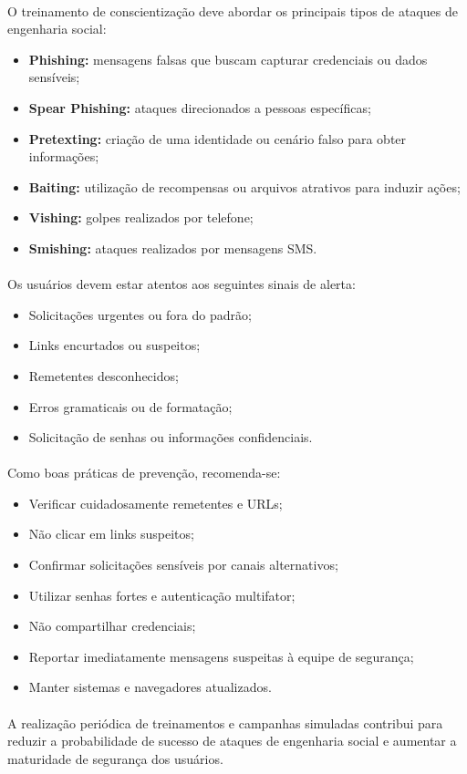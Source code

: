 \paragraph{}
O treinamento de conscientização deve abordar os principais tipos de ataques de
engenharia social:

\begin{itemize}
    \item \textbf{Phishing:} mensagens falsas que buscam capturar credenciais
      ou dados sensíveis;
    \item \textbf{Spear Phishing:} ataques direcionados a pessoas específicas;
    \item \textbf{Pretexting:} criação de uma identidade ou cenário falso para
      obter informações;
    \item \textbf{Baiting:} utilização de recompensas ou arquivos atrativos
      para induzir ações;
    \item \textbf{Vishing:} golpes realizados por telefone;
    \item \textbf{Smishing:} ataques realizados por mensagens SMS.
\end{itemize}

\paragraph{}
Os usuários devem estar atentos aos seguintes sinais de alerta:

\begin{itemize}
    \item Solicitações urgentes ou fora do padrão;
    \item Links encurtados ou suspeitos;
    \item Remetentes desconhecidos;
    \item Erros gramaticais ou de formatação;
    \item Solicitação de senhas ou informações confidenciais.
\end{itemize}

\paragraph{}
Como boas práticas de prevenção, recomenda-se:

\begin{itemize}
    \item Verificar cuidadosamente remetentes e URLs;
    \item Não clicar em links suspeitos;
    \item Confirmar solicitações sensíveis por canais alternativos;
    \item Utilizar senhas fortes e autenticação multifator;
    \item Não compartilhar credenciais;
    \item Reportar imediatamente mensagens suspeitas à equipe de segurança;
    \item Manter sistemas e navegadores atualizados.
\end{itemize}

\paragraph{}
A realização periódica de treinamentos e campanhas simuladas contribui para
reduzir a probabilidade de sucesso de ataques de engenharia social e aumentar a
maturidade de segurança dos usuários.

